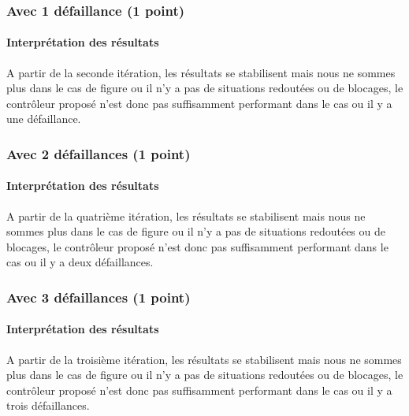 \documentclass[a4paper]{book}
\begin{document}
\subsubsection{Avec 1 défaillance (1 point)}





\paragraph{Interprétation des résultats}
A partir de la seconde itération, les résultats se stabilisent mais nous ne sommes plus dans le cas de figure ou il n'y a pas de situations redoutées ou de blocages, le contrôleur proposé n'est donc pas suffisamment performant dans le cas ou il y a une défaillance.

\subsubsection{Avec 2 défaillances (1 point)}





\paragraph{Interprétation des résultats}
A partir de la quatrième itération, les résultats se stabilisent mais nous ne sommes plus dans le cas de figure ou il n'y a pas de situations redoutées ou de blocages, le contrôleur proposé n'est donc pas suffisamment performant dans le cas ou il y a deux défaillances.

\subsubsection{Avec 3 défaillances (1 point)}





\paragraph{Interprétation des résultats}
A partir de la troisième itération, les résultats se stabilisent mais nous ne sommes plus dans le cas de figure ou il n'y a pas de situations redoutées ou de blocages, le contrôleur proposé n'est donc pas suffisamment performant dans le cas ou il y a trois défaillances.
\end{document}
